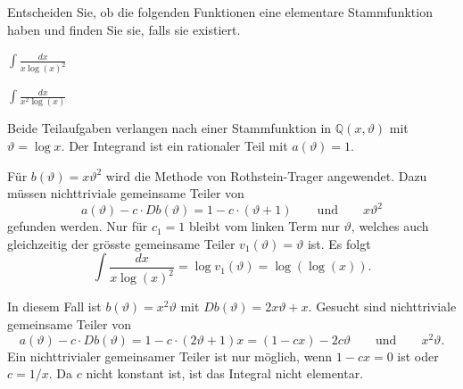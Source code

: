 Entscheiden Sie, ob die folgenden Funktionen eine elementare Stammfunktion
haben und finden Sie sie, falls sie existiert.
\begin{teilaufgaben}
\item
$\displaystyle \int \frac{dx}{x\log(x)^2}$
\item
$\displaystyle \int \frac{dx}{x^2\log(x)}$
\end{teilaufgaben}

\begin{loesung}
Beide Teilaufgaben verlangen nach einer Stammfunktion in $\mathbb{Q}(x,\vartheta)$ mit $\vartheta=\log x$.
Der Integrand ist ein rationaler Teil mit $a(\vartheta)=1$.
\begin{teilaufgaben}
\item Für $b(\vartheta)=x\vartheta^2$ wird die Methode von Rothstein-Trager
angewendet.
Dazu müssen nichttriviale gemeinsame Teiler von
\[
a(\vartheta)-c\cdot Db(\vartheta)
=
1-c\cdot (\vartheta + 1)
\qquad\text{und}\qquad
x\vartheta^2
\]
gefunden werden.
Nur für $c_1=1$ bleibt vom linken Term nur $\vartheta$, welches auch
gleichzeitig der grösste gemeinsame Teiler $v_1(\vartheta)=\vartheta$ ist.
Es folgt
\[
\int \frac{dx}{x\log(x)^2}
=
\log v_1(\vartheta)
=
\log(\log(x)).
\]
\item
In diesem Fall ist $b(\vartheta)=x^2\vartheta$ mit $Db(\vartheta) = 2x\vartheta + x$.
Gesucht sind nichttriviale gemeinsame Teiler von
\[
a(\vartheta)-c\cdot Db(\vartheta)
=
1-c\cdot (2\vartheta+1)x
=
(1-cx) -2c\vartheta
\qquad\text{und}\qquad
x^2\vartheta.
\]
Ein nichttrivialer gemeinsamer Teiler ist nur möglich, wenn $1-cx=0$ ist
oder $c=1/x$.
Da $c$ nicht konstant ist, ist das Integral nicht elementar.
\qedhere
\end{teilaufgaben}
\end{loesung}
